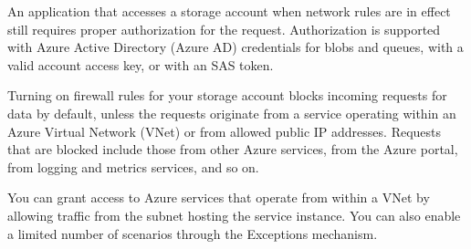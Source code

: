 An application that accesses a storage account when network rules are in effect still requires proper authorization for the request. Authorization is supported with Azure Active Directory (Azure AD) credentials for blobs and queues, with a valid account access key, or with an SAS token.

Turning on firewall rules for your storage account blocks incoming requests for data by default, unless the requests originate from a service operating within an Azure Virtual Network (VNet) or from allowed public IP addresses. Requests that are blocked include those from other Azure services, from the Azure portal, from logging and metrics services, and so on.

You can grant access to Azure services that operate from within a VNet by allowing traffic from the subnet hosting the service instance. You can also enable a limited number of scenarios through the Exceptions mechanism.

\begin{tabular}{c c p{6cm}}

\end{tabular}
